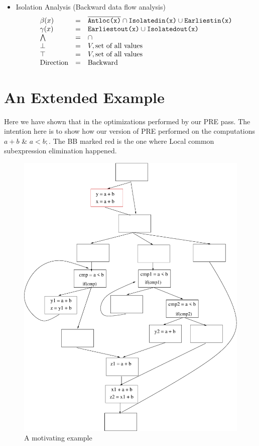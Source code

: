 \begin{itemize}
\item Isolation Analysis (Backward data flow analysis)
\begin{equation}
\begin{array}{l c l}
\beta(x)      &=& \overline{\texttt{Antloc(x)}} \cap \texttt{Isolatedin(x)} \cup \texttt{Earliestin(x)}     \\     
\gamma(x)   &=& \texttt{Earliestout(x)} \cup \texttt{Isolatedout(x)} \\
\bigwedge     &=&  \cap \\
\bot          &=& V, \text{set of all values} \\
\top          &=& V, \text{set of all values} \\
\text{Direction}    &=& \text{Backward}
\end{array}
\end{equation}

\end{itemize}

\chapter{An Extended Example}

Here we have shown that in the optimizations performed
by our PRE pass. The intention here is to show how our version of PRE performed on the
computations $a + b$ \& $a < b;$.
The BB marked red is the one where Local common subexpression elimination happened.


\begin{figure}[htbp]
  \begin{center}
     \includegraphics[scale=0.3]{Figs/1} 
  \end{center}
  \caption{A motivating example}
    \label{fig:1} 
\end{figure}


